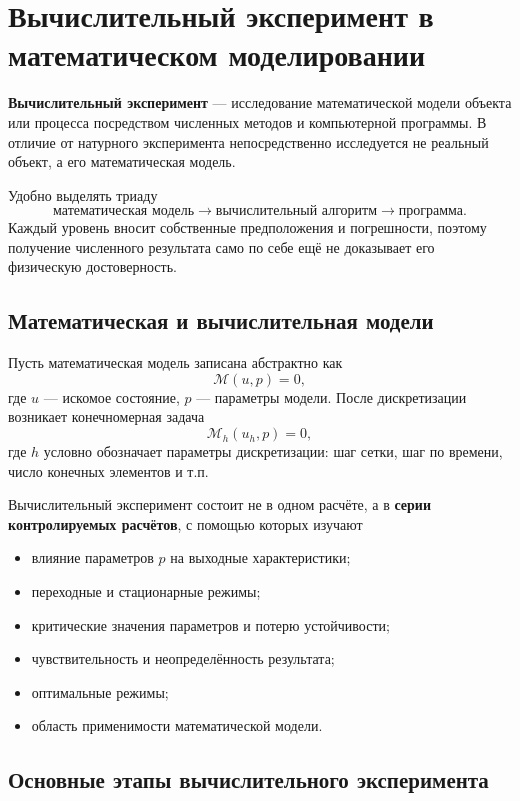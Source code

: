 \section{Вычислительный эксперимент в математическом моделировании}
\label{sec:computational_experiment}

\textbf{Вычислительный эксперимент} --- исследование математической модели
объекта или процесса посредством численных методов и компьютерной
программы. В отличие от натурного эксперимента непосредственно исследуется
не реальный объект, а его математическая модель.

Удобно выделять триаду
\[
\boxed{
\text{математическая модель}
\longrightarrow
\text{вычислительный алгоритм}
\longrightarrow
\text{программа}
}.
\]
Каждый уровень вносит собственные предположения и погрешности, поэтому
получение численного результата само по себе ещё не доказывает его
физическую достоверность.

\subsection{Математическая и вычислительная модели}

Пусть математическая модель записана абстрактно как
\[
\mathcal M(u,p)=0,
\]
где $u$ --- искомое состояние, $p$ --- параметры модели. После
дискретизации возникает конечномерная задача
\[
\mathcal M_h(u_h,p)=0,
\]
где $h$ условно обозначает параметры дискретизации: шаг сетки, шаг по
времени, число конечных элементов и т.п.

Вычислительный эксперимент состоит не в одном расчёте, а в
\textbf{серии контролируемых расчётов}, с помощью которых изучают
\begin{itemize}
    \item влияние параметров $p$ на выходные характеристики;
    \item переходные и стационарные режимы;
    \item критические значения параметров и потерю устойчивости;
    \item чувствительность и неопределённость результата;
    \item оптимальные режимы;
    \item область применимости математической модели.
\end{itemize}

\subsection{Основные этапы вычислительного эксперимента}

